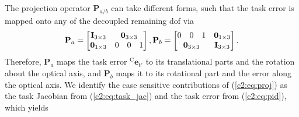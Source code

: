 The projection operator $\mathbf{P}_{a/b}$ can take different forms, such that the task error is mapped onto any of the decoupled remaining \acrshort{dof} via
\begin{equation}
    \mathbf{P}_a = \begin{bmatrix}
        \mathbf{I}_{3\times3} & \multicolumn{3}{c}{\mathbf{0}_{3\times3}} \\
        \mathbf{0}_{1\times3} & 0 & 0 & 1
    \end{bmatrix},
    \mathbf{P}_b =
    \begin{bmatrix}
        0 & 0 & 1 & \mathbf{0}_{1\times3} \\
        \multicolumn{3}{c}{\mathbf{0}_{3\times3}} & \mathbf{I}_{3\times3}
    \end{bmatrix}.
    \label{c2:eq:projection}
\end{equation}
Therefore, $\mathbf{P}_a$ maps the task error $^\text{C}\mathbf{e}_{\text{t}'}$ to its translational parts and the rotation about the optical axis, and $\mathbf{P}_b$ maps it to its rotational part and the error along the optical axis. We identify the case sensitive contributions of (\eqref{c2:eq:proj}) as the task Jacobian from (\eqref{c2:eq:task_jac}) and the task error from (\eqref{c2:eq:pid}), which yields
